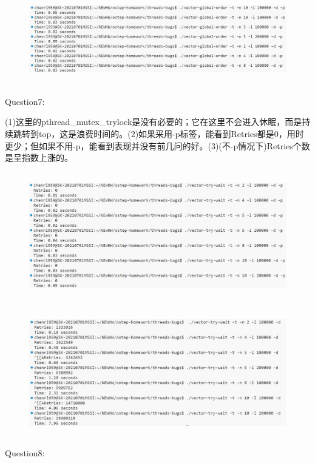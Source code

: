 \documentclass[12pt]{article}
\begin{document}
\begin{figure}[H]
    \centering
    \includegraphics[height=4cm]{hw10-2.jpg}
\end{figure}
\begin{large}
    \noindent Question7:\par
\end{large}
(1)这里的pthread\_mutex\_trylock是没有必要的；它在这里不会进入休眠，而是持续跳转到top，这是浪费时间的。(2)如果采用-p标签，能看到Retries都是0，用时更少；但如果不用-p，能看到表现并没有前几问的好。(3)(不-p情况下)Retries个数是呈指数上涨的。
\begin{figure}[H]
    \centering
    \includegraphics[height=5.5cm]{hw10-3.jpg}
\end{figure}
\begin{figure}[H]
    \centering
    \includegraphics[height=5.5cm]{hw10-4.jpg}
\end{figure}
\newpage
\begin{large}
    \noindent Question8:\par
\end{large}
\end{document}

